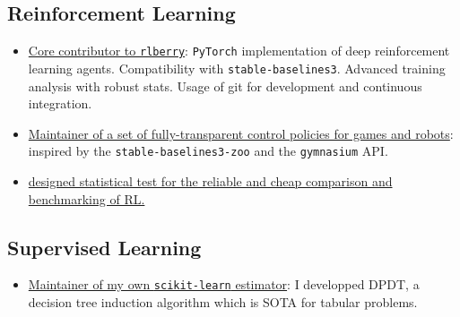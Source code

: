 \subsection*{Reinforcement Learning}
\begin{itemize}
    \item[] \href{https://rlberry-py.github.io/rlberry/about.html#contributors}{Core contributor to \texttt{rlberry}}: \texttt{PyTorch} implementation of deep reinforcement learning agents. Compatibility with \texttt{stable-baselines3}. Advanced training analysis with robust stats. Usage of git for development and continuous integration.
    \item[] \href{https://github.com/KohlerHECTOR/interpretable-rl-zoo}{Maintainer of a set of fully-transparent control policies for games and robots}: inspired by the \texttt{stable-baselines3-zoo} and the \texttt{gymnasium} API.
    \item[] \href{https://github.com/TimotheeMathieu/adastop}{designed statistical test for the reliable and cheap comparison and benchmarking of RL.}
\end{itemize}


\subsection*{Supervised Learning}

\begin{itemize}
    \item[] \href{https://github.com/KohlerHECTOR/DPDTreeEstimator}{Maintainer of my own \texttt{scikit-learn} estimator}: I developped DPDT, a decision tree induction algorithm which is SOTA for tabular problems. 
\end{itemize}

